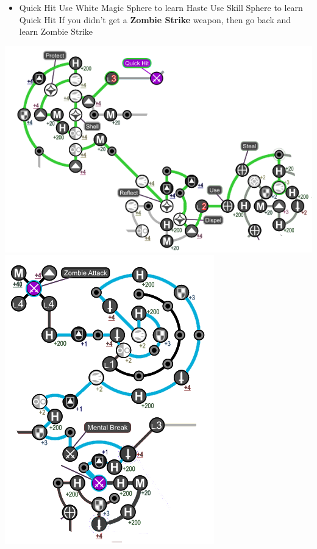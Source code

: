 \begin{spheregrid}
\begin{multicols}{2}
\begin{itemize}
\begin{itemize}
		\item Quick Hit
		\yunaf Use White Magic Sphere to learn Haste
		\yunaf Use Skill Sphere to learn Quick Hit
		\tidusf If you didn't get a \textbf{Zombie Strike} weapon, then go back and learn Zombie Strike
	\end{itemize}
	\includegraphics[width=.9\columnwidth]{graphics/Quick_hit}
	\includegraphics[width=.6\columnwidth]{graphics/Tidus_zombie}
\end{itemize}
\end{multicols}
\end{spheregrid}
